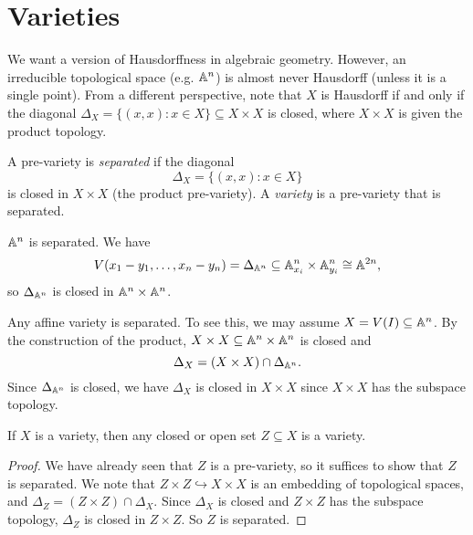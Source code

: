 \section{Varieties}

\begin{remark}
  We want a version of Hausdorffness in
  algebraic geometry. However, an
  irreducible topological space
  (e.g. $\mathbb{A}^n$) is almost never
  Hausdorff (unless it is a single point).
  From a different perspective, note
  that $X$ is Hausdorff if and only if
  the diagonal
  $\Delta_X = \{(x, x) : x \in X\} \subseteq X \times X$ is
  closed, where $X \times X$ is given
  the product topology.
\end{remark}

\begin{definition}
  A pre-variety is \emph{separated} if
  the diagonal
  \[
    \Delta_X = \{(x, x) : x \in X\}
  \]
  is closed in $X \times X$ (the product
  pre-variety). A \emph{variety} is a
  pre-variety that is separated.
\end{definition}

\begin{example}
  $\mathbb{A}^n$ is separated. We have
  \[
    V(x_1 - y_1, \dots, x_n - y_n)
    = \Delta_{\mathbb{A}^n} \subseteq
    \mathbb{A}_{x_i}^n \times \mathbb{A}_{y_i}^n
    \cong \mathbb{A}^{2n},
  \]
  so $\Delta_{\mathbb{A}^n}$ is closed
  in $\mathbb{A}^n \times \mathbb{A}^n$.
\end{example}

\begin{example}
  Any affine variety is separated. To
  see this, we may assume $X = V(I) \subseteq \mathbb{A}^n$.
  By the construction of the product,
  $X \times X \subseteq \mathbb{A}^n \times \mathbb{A}^n$
  is closed and
  \[
    \Delta_X
    = (X \times X) \cap \Delta_{\mathbb{A}^n}.
  \]
  Since $\Delta_{\mathbb{A}^n}$ is closed,
  we have
  $\Delta_X$ is closed in $X \times X$ since
  $X \times X$ has the subspace topology.
\end{example}

\begin{prop}
  If $X$ is a variety, then any
  closed or open set $Z \subseteq X$
  is a variety.
\end{prop}

\begin{proof}
  We have already seen that $Z$ is a
  pre-variety, so it suffices to show that
  $Z$ is separated. We note that
  $Z \times Z \hookrightarrow X \times X$
  is an embedding of topological spaces,
  and $\Delta_Z = (Z \times Z) \cap \Delta_X$.
  Since $\Delta_X$ is closed and
  $Z \times Z$ has the subspace topology,
  $\Delta_Z$ is closed in $Z \times Z$.
  So $Z$ is separated.
\end{proof}

